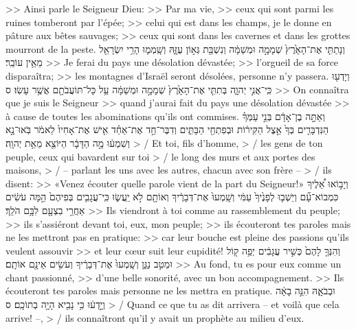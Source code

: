 \begin{paracol}[1]
{    >> Ainsi parle le Seigneur Dieu:
    >> Par ma vie,
    >> ceux qui sont parmi les ruines tomberont par l’épée;
    >> celui qui est dans les champs, je le donne en pâture aux bêtes sauvages;
    >> ceux qui sont dans les cavernes et dans les grottes mourront de la peste.}
  \verset
  {וְנָתַתִּ֤י אֶת־הָאָ֙רֶץ֙ שְׁמָמָ֣ה וּמְשַׁמָּ֔ה
    וְנִשְׁבַּ֖ת גְּא֣וֹן עֻזָּ֑הּ
    וְשָֽׁמְמ֛וּ הָרֵ֥י יִשְׂרָאֵ֖ל מֵאֵ֥ין עוֹבֵֽר׃}
  {>> Je ferai du pays une désolation dévastée;
    >> l’orgueil de sa force disparaîtra;
    >> les montagnes d’Israël seront désolées, personne n’y passera.}
  \verset
  {וְיָדְע֖וּ כִּֽי־אֲנִ֣י יְהוָ֑ה
    בְּתִתִּ֤י אֶת־הָאָ֙רֶץ֙ שְׁמָמָ֣ה וּמְשַׁמָּ֔ה
    עַ֥ל כָּל־תּוֹעֲבֹתָ֖ם אֲשֶׁ֥ר עָשֽׂוּ׃ ס}
  {>> On connaîtra que je suis le Seigneur
    >> quand j’aurai fait du pays une désolation dévastée
    >> à cause de toutes les abominations qu’ils ont commises.}
  \parSpace
  \verset
  {וְאַתָּ֣ה בֶן־אָדָ֔ם
    בְּנֵ֣י עַמְּךָ֗ הַנִּדְבָּרִ֤ים בְּךָ֙
    אֵ֣צֶל הַקִּיר֔וֹת וּבְפִתְחֵ֖י הַבָּתִּ֑ים
    וְדִבֶּר־חַ֣ד אֶת־אַחַ֗ד אִ֤ישׁ אֶת־אָחִיו֙
    לֵאמֹ֔ר
    בֹּֽאוּ־נָ֣א וְשִׁמְע֔וּ מָ֣ה הַדָּבָ֔ר הַיּוֹצֵ֖א מֵאֵ֥ת יְהוָֽה׃}
  {> / Et toi, fils d’homme,
    > / les gens de ton peuple, ceux qui bavardent sur toi
    > / le long des murs et aux portes des maisons,
    > / – parlant les uns avec les autres, chacun avec son frère –
    > / ils disent:
    >> «Venez écouter quelle parole vient de la part du Seigneur!»}
  \verset
  {וְיָב֣וֹאוּ אֵ֠לֶיךָ כִּמְבוֹא־עָ֞ם
    וְיֵשְׁב֤וּ לְפָנֶ֙יךָ֙ עַמִּ֔י
    וְשָֽׁמְעוּ֙ אֶת־דְּבָרֶ֔יךָ וְאוֹתָ֖ם לֹ֣א יַֽעֲשׂ֑וּ
    כִּֽי־עֲגָבִ֤ים בְּפִיהֶם֙ הֵ֣מָּה עֹשִׂ֔ים
    אַחֲרֵ֥י בִצְעָ֖ם לִבָּ֥ם הֹלֵֽךְ׃}
  {>> Ils viendront à toi comme au rassemblement du peuple;
    >> ils s’assiéront devant toi, eux, mon peuple;
    >> ils écouteront tes paroles mais ne les mettront pas en pratique:
    >> car leur bouche est pleine des passions qu’ils veulent assouvir
    >> et leur cœur suit leur cupidité!}
  \verset
  {וְהִנְּךָ֤ לָהֶם֙ כְּשִׁ֣יר עֲגָבִ֔ים יְפֵ֥ה
    ק֖וֹל וּמֵטִ֣ב נַגֵּ֑ן
    וְשָֽׁמְעוּ֙ אֶת־דְּבָרֶ֔יךָ וְעֹשִׂ֥ים אֵינָ֖ם אוֹתָֽם׃}
  {>> Au fond, tu es pour eux comme un chant passionné,
    >> d’une belle sonorité, avec un bon accompagnement.
    >> Ils écouteront tes paroles mais personne ne les mettra en pratique.}
  \verseSpace
  \verset
  {וּבְבֹאָ֑הּ הִנֵּ֣ה בָאָ֔ה
    וְיָ֣דְע֔וּ כִּ֥י נָבִ֖יא הָיָ֥ה בְתוֹכָֽם׃ ס}
  {> / Quand ce que tu as dit arrivera – et voilà que cela arrive! –,
    > / ils connaîtront qu’il y avait un prophète au milieu d’eux.}
  \clearpage


\end{paracol}
